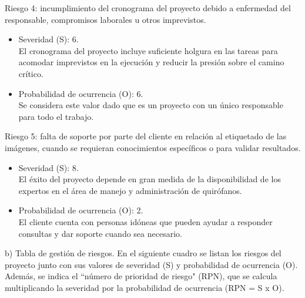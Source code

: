\documentclass[
11pt, %
]{charter}
\begin{document}
Riesgo 4: incumplimiento del cronograma del proyecto debido a enfermedad del responsable, compromisos laborales u otros imprevistos.
\begin{itemize}
	\item Severidad (S): 6.\\
	El cronograma del proyecto incluye suficiente holgura en las tareas para acomodar imprevistos en la ejecución y reducir la presión sobre el camino crítico.
	\item Probabilidad de ocurrencia (O): 6.\\
	Se considera este valor dado que es un proyecto con un único responsable para todo el trabajo.  
\end{itemize}   

Riesgo 5: falta de soporte por parte del cliente en relación al etiquetado de las imágenes, cuando se requieran conocimientos específicos o para validar resultados.
\begin{itemize}
	\item Severidad (S): 8.\\
	El éxito del proyecto depende en gran medida de la disponibilidad de los expertos en el área de manejo y administración de quirófanos. 
	\item Probabilidad de ocurrencia (O): 2.\\
	El cliente cuenta con personas idóneas que pueden ayudar a responder consultas y dar soporte cuando sea necesario. 
\end{itemize}   



b) Tabla de gestión de riesgos.
En el siguiente cuadro se listan los riesgos del proyecto junto con sus valores de severidad (S) y probabilidad de ocurrencia (O). Además, se indica el ``número de prioridad de riesgo" (RPN), que se calcula multiplicando la severidad por la probabilidad de ocurrencia (RPN = S x O).
\end{document}
